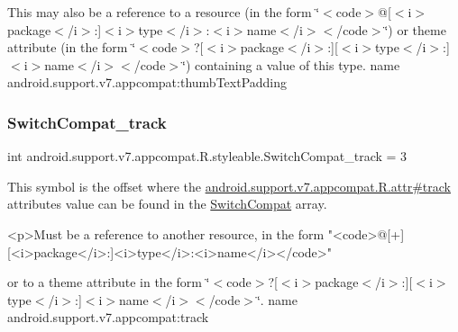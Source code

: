 This may also be a reference to a resource (in the form \char`\"{}$<$code$>$@\mbox{[}$<$i$>$package$<$/i$>$\+:\mbox{]}$<$i$>$type$<$/i$>$\+:$<$i$>$name$<$/i$>$$<$/code$>$\char`\"{}) or theme attribute (in the form \char`\"{}$<$code$>$?\mbox{[}$<$i$>$package$<$/i$>$\+:\mbox{]}\mbox{[}$<$i$>$type$<$/i$>$\+:\mbox{]}$<$i$>$name$<$/i$>$$<$/code$>$\char`\"{}) containing a value of this type.  name android.\+support.\+v7.\+appcompat\+:thumb\+Text\+Padding \mbox{\label{classandroid_1_1support_1_1v7_1_1appcompat_1_1R_1_1styleable_a5b22cfa465ad7bdc9074b49b94bfc8fb}} 
\subsubsection{\texorpdfstring{Switch\+Compat\+\_\+track}{SwitchCompat\_track}}
{\footnotesize\ttfamily int android.\+support.\+v7.\+appcompat.\+R.\+styleable.\+Switch\+Compat\+\_\+track = 3\hspace{0.3cm}{\ttfamily [static]}}

This symbol is the offset where the \hyperlink{classandroid_1_1support_1_1v7_1_1appcompat_1_1R_1_1attr_a8d34459bf1b56730d9db07c0105fef49}{android.\+support.\+v7.\+appcompat.\+R.\+attr\#track} attribute\textquotesingle{}s value can be found in the \hyperlink{classandroid_1_1support_1_1v7_1_1appcompat_1_1R_1_1styleable_aabe688560752254f2288f3eaf9439737}{Switch\+Compat} array.

\begin{DoxyVerb}      <p>Must be a reference to another resource, in the form "<code>@[+][<i>package</i>:]<i>type</i>:<i>name</i></code>"
\end{DoxyVerb}
 or to a theme attribute in the form \char`\"{}$<$code$>$?\mbox{[}$<$i$>$package$<$/i$>$\+:\mbox{]}\mbox{[}$<$i$>$type$<$/i$>$\+:\mbox{]}$<$i$>$name$<$/i$>$$<$/code$>$\char`\"{}.  name android.\+support.\+v7.\+appcompat\+:track \mbox{\label{classandroid_1_1support_1_1v7_1_1appcompat_1_1R_1_1styleable_a78bd85485eab436a2e9ff45b047ab398}} 
